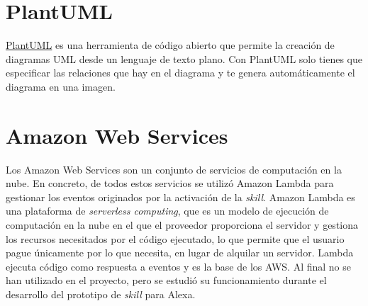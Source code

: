 \section{PlantUML}

\href{https://plantuml.com/es/}{PlantUML} \cite{PlantUML2020} es una herramienta de código abierto que permite la creación de diagramas UML desde un lenguaje de texto plano. Con PlantUML solo tienes que especificar las relaciones que hay en el diagrama y te genera automáticamente el diagrama en una imagen.

\section{Amazon Web Services}

Los Amazon Web Services \cite{AmazonWebServices2020} son un conjunto de servicios de computación en la nube. En concreto, de todos estos servicios se utilizó Amazon Lambda para gestionar los eventos originados por la activación de la \textit{skill}. Amazon Lambda es una plataforma de \textit{serverless computing}\cite{ServerlessComputing2020}, que es un modelo de ejecución de computación en la nube en el que el proveedor proporciona el servidor y gestiona los recursos necesitados por el código ejecutado, lo que permite que el usuario pague únicamente por lo que necesita, en lugar de alquilar un servidor. Lambda ejecuta código como respuesta a eventos y es la base de los AWS. Al final no se han utilizado en el proyecto, pero se estudió su funcionamiento durante el desarrollo del prototipo de \textit{skill} para Alexa.
